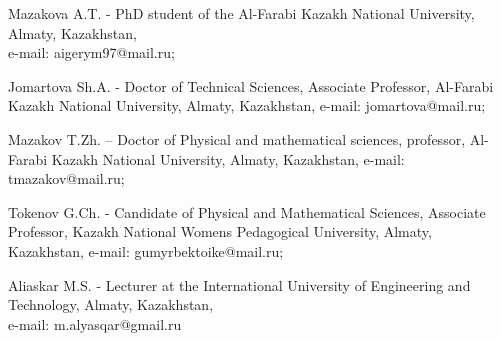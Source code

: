\begin{noparindent}
Mazakova A.T. - PhD student of the Al-Farabi Kazakh National University,
Almaty, Kazakhstan, \\e-mail: aigerym97@mail.ru;

Jomartova Sh.A. - Doctor of Technical Sciences, Associate Professor,
Al-Farabi Kazakh National University, Almaty, Kazakhstan, e-mail:
jomartova@mail.ru;

Mazakov T.Zh. -- Doctor of Physical and mathematical sciences,
professor, Al-Farabi Kazakh National University, Almaty, Kazakhstan,
e-mail: tmazakov@mail.ru;

Tokenov G.Ch. - Candidate of Physical and Mathematical Sciences,
Associate Professor, Kazakh National Women\textquotesingle s Pedagogical
University, Almaty, Kazakhstan, e-mail: gumyrbektoike@mail.ru;

Aliaskar M.S. - Lecturer at the International University of Engineering
and Technology, Almaty, Kazakhstan,\\e-mail: m.alyasqar@gmail.ru
\end{noparindent}
